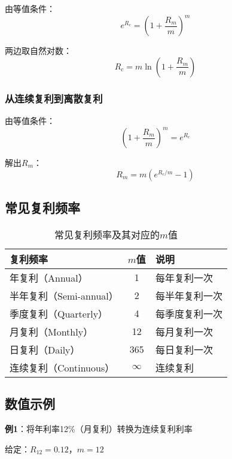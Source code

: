 由等值条件：
\begin{equation}
e^{R_c} = \left(1 + \frac{R_m}{m}\right)^m
\end{equation}

两边取自然对数：
\begin{equation}
\boxed{R_c = m \ln\left(1 + \frac{R_m}{m}\right)}
\end{equation}

\subsubsection{从连续复利到离散复利}

由等值条件：
\begin{equation}
\left(1 + \frac{R_m}{m}\right)^m = e^{R_c}
\end{equation}

解出$R_m$：
\begin{equation}
\boxed{R_m = m\left(e^{R_c/m} - 1\right)}
\end{equation}

\subsection{常见复利频率}

\begin{table}[h]
\centering
\caption{常见复利频率及其对应的$m$值}
\begin{tabular}{|l|c|l|}
\hline
\textbf{复利频率} & \textbf{$m$值} & \textbf{说明} \\
\hline
年复利（Annual） & 1 & 每年复利一次 \\
半年复利（Semi-annual） & 2 & 每半年复利一次 \\
季度复利（Quarterly） & 4 & 每季度复利一次 \\
月复利（Monthly） & 12 & 每月复利一次 \\
日复利（Daily） & 365 & 每日复利一次 \\
连续复利（Continuous） & $\infty$ & 连续复利 \\
\hline
\end{tabular}
\end{table}

\subsection{数值示例}

\textbf{例1}：将年利率12\%（月复利）转换为连续复利利率

给定：$R_{12} = 0.12$，$m = 12$

